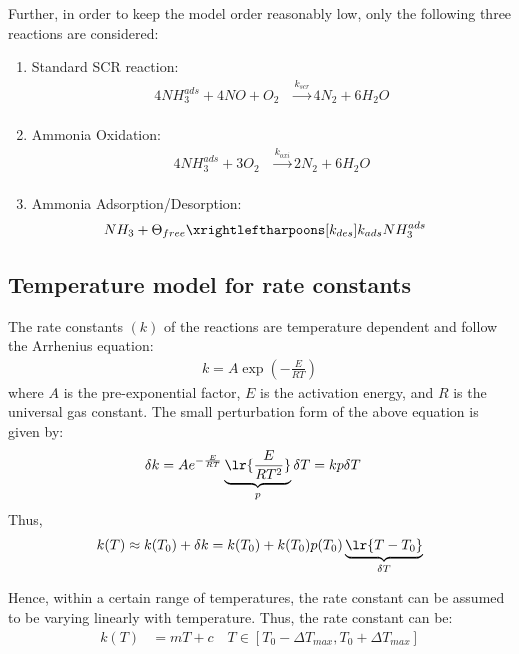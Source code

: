 Further, in order to keep the model order reasonably low, only the following three reactions are considered:
\begin{enumerate}
    \item Standard SCR reaction:
    \begin{align}
        4 NH_3 ^{ads} + 4 NO + O_2 &\xrightarrow[]{k_{scr}} 4 N_2 + 6 H_2O \label{eqn::std_scr}
    \end{align}
    \item Ammonia Oxidation:
    \begin{align}
        4 NH_3^{ads} + 3 O_2 &\xrightarrow[]{k_{oxi}} 2 N_2 + 6 H_2O \label{eqn::amox}
    \end{align}
    \item Ammonia Adsorption/Desorption:
        \begin{align}
            NH_3 + \Theta_{free} &\xrightleftharpoons[k_{des}]{k_{ads}} NH_3^{ads}
            \label{eqn::ads}
        \end{align}
\end{enumerate}


\subsection{Temperature model for rate constants}
The rate constants $(k)$ of the reactions are temperature dependent and follow the Arrhenius equation:
\begin{align*}
    k = A \exp\left(-\frac{E}{RT}\right)
\end{align*}
where $A$ is the pre-exponential factor, $E$ is the activation energy, and $R$ is the universal gas constant. The small
perturbation form of the above equation is given by:
\begin{align*}
    \delta k &= A e^{-\frac{E}{RT}} \underbrace{\lr{\frac{E}{RT^2}}}_p \delta T = k p \delta T
\end{align*}
Thus,
\begin{align*}
    k(T) \approx k(T_0) + \delta k = k(T_0) + k(T_0) p(T_0) \underbrace{\lr{T - T_0}}_{\delta T}
\end{align*}

Hence, within a certain range of temperatures, the rate constant can be assumed to be varying linearly with temperature.
Thus, the rate constant can be:
\begin{align*}
    k(T) &= mT + c \quad T \in [T_0 - \Delta T_{max}, T_0 + \Delta T_{max}]
\end{align*}

